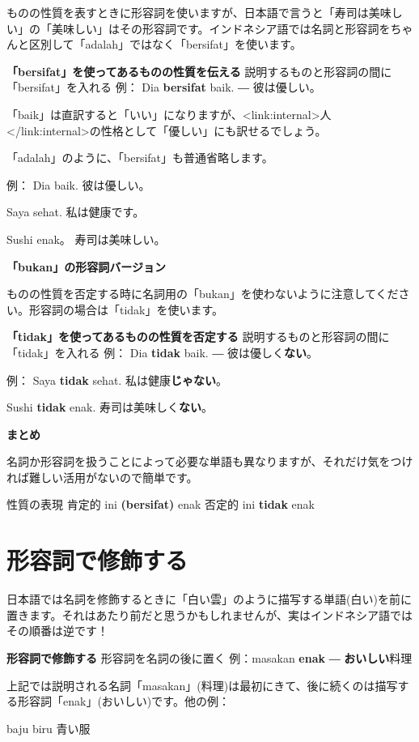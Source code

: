 \documentclass[uplatex]{jsarticle}
\begin{document}
ものの性質を表すときに形容詞を使いますが、日本語で言うと「寿司は美味しい」の「美味しい」はその形容詞です。インドネシア語では名詞と形容詞をちゃんと区別して「adalah」ではなく「bersifat」を使います。

\textbf{「bersifat」を使ってあるものの性質を伝える}
説明するものと形容詞の間に「bersifat」を入れる
例： Dia \textbf{bersifat} baik.  ― 彼は優しい。

「baik」は直訳すると「いい」になりますが、<link:internal>人</link:internal>の性格として「優しい」にも訳せるでしょう。

「adalah」のように、「bersifat」も普通省略します。

例：
Dia baik.
彼は優しい。

Saya sehat.
私は健康です。

Sushi enak。
寿司は美味しい。

\textbf{「bukan」の形容詞バージョン}

ものの性質を否定する時に名詞用の「bukan」を使わないように注意してください。形容詞の場合は「tidak」を使います。

\textbf{「tidak」を使ってあるものの性質を否定する}
説明するものと形容詞の間に「tidak」を入れる
例： Dia \textbf{tidak} baik.  ― 彼は優しく\textbf{ない}。

例：
Saya \textbf{tidak} sehat.
私は健康\textbf{じゃない}。

Sushi \textbf{tidak} enak.
寿司は美味しく\textbf{ない}。

\textbf{まとめ}

名詞か形容詞を扱うことによって必要な単語も異なりますが、それだけ気をつければ難しい活用がないので簡単です。

		性質の表現
肯定的	ini \textbf{(bersifat)} enak
否定的	ini \textbf{tidak} enak

\section{形容詞で修飾する}

日本語では名詞を修飾するときに「白い雲」のように描写する単語(白い)を前に置きます。それはあたり前だと思うかもしれませんが、実はインドネシア語ではその順番は逆です！

\textbf{形容詞で修飾する}
形容詞を名詞の後に置く
例：masakan \textbf{enak} ― \textbf{おいしい}料理

上記では説明される名詞「masakan」(料理)は最初にきて、後に続くのは描写する形容詞「enak」(おいしい)です。他の例：

baju biru
青い服
\end{document}
